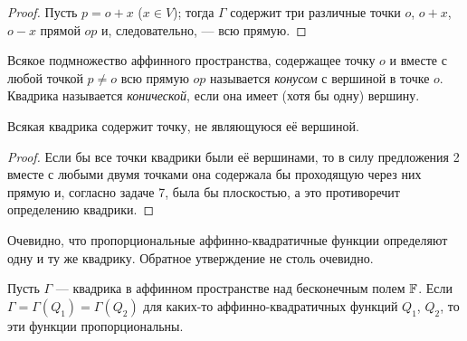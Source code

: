 \begin{proof}
    Пусть $p = o + x$ ($x \in V$); тогда $\Gamma$ содержит три различные точки $o$, $o + x$, $o - x$ прямой $op$ и, следовательно, --- всю прямую.
\end{proof}

\begin{definition}
    Всякое подмножество аффинного пространства, содержащее точку $o$ и вместе с любой точкой $p \ne o$ всю прямую $op$ называется \textit{конусом} с вершиной в точке $o$. Квадрика называется \textit{конической}, если она имеет (хотя бы одну) вершину.
\end{definition}

\begin{proposal}
    Всякая квадрика содержит точку, не являющуюся её вершиной.
\end{proposal}

\begin{proof}
    Если бы все точки квадрики были её вершинами, то в силу предложения 2 вместе с любыми двумя точками она содержала бы проходящую через них прямую и, согласно задаче 7, была бы плоскостью, а это противоречит определению квадрики.
\end{proof}

Очевидно, что пропорциональные аффинно-квадратичные функции определяют одну и ту же квадрику. Обратное утверждение не столь очевидно.

\begin{theorem}
    Пусть $\Gamma$ --- квадрика в аффинном пространстве над бесконечным полем $\mathbb{F}$. Если $\Gamma = \Gamma(Q_1) = \Gamma(Q_2)$ для каких-то аффинно-квадратичных функций $Q_1$, $Q_2$, то эти функции пропорциональны.
\end{theorem}

